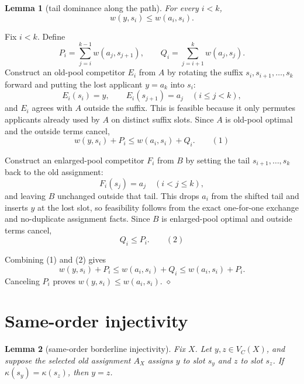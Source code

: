 \documentclass[11pt]{article}
\newtheorem{lemma}{Lemma}
\newenvironment{proof}{\par\noindent{\it Proof. }}{\hfill$\diamond$\par}
\newcommand{\chosen}{C}
\newcommand{\border}{V_{\chosen}}
\newcommand{\weight}{w}
\newcommand{\class}{\kappa}
\begin{document}
\begin{lemma}[tail dominance along the path]
For every $i<k$,
\[
  \weight(y,s_i) \le \weight(a_i,s_i).
\]
\end{lemma}

\begin{proof}
Fix $i<k$.  Define
\[
  P_i=\sum_{j=i}^{k-1}\weight(a_j,s_{j+1}),
  \qquad
  Q_i=\sum_{j=i+1}^{k}\weight(a_j,s_j).
\]
Construct an old-pool competitor $E_i$ from $A$ by rotating the suffix
$s_i,s_{i+1},\ldots,s_k$ forward and putting the lost applicant $y=a_k$ into
$s_i$:
\[
  E_i(s_i)=y,\qquad
  E_i(s_{j+1})=a_j \quad (i\le j<k),
\]
and $E_i$ agrees with $A$ outside the suffix.  This is feasible because it only
permutes applicants already used by $A$ on distinct suffix slots.  Since $A$ is
old-pool optimal and the outside terms cancel,
\[
  \weight(y,s_i)+P_i \le \weight(a_i,s_i)+Q_i. \qquad (1)
\]

Construct an enlarged-pool competitor $F_i$ from $B$ by setting the tail
$s_{i+1},\ldots,s_k$ back to the old assignment:
\[
  F_i(s_j)=a_j \quad (i<j\le k),
\]
and leaving $B$ unchanged outside that tail.  This drops $a_i$ from the shifted
tail and inserts $y$ at the lost slot, so feasibility follows from the exact
one-for-one exchange and no-duplicate assignment facts.  Since $B$ is
enlarged-pool optimal and outside terms cancel,
\[
  Q_i \le P_i. \qquad (2)
\]

Combining (1) and (2) gives
\[
  \weight(y,s_i)+P_i
  \le
  \weight(a_i,s_i)+Q_i
  \le
  \weight(a_i,s_i)+P_i.
\]
Canceling $P_i$ proves $\weight(y,s_i)\le \weight(a_i,s_i)$.
\end{proof}

\section*{Same-order injectivity}

\begin{lemma}[same-order borderline injectivity]
Fix $X$.  Let $y,z\in \border(X)$, and suppose the selected old assignment
$A_X$ assigns $y$ to slot $s_y$ and $z$ to slot $s_z$.  If
$\class(s_y)=\class(s_z)$, then $y=z$.
\end{lemma}
\end{document}
